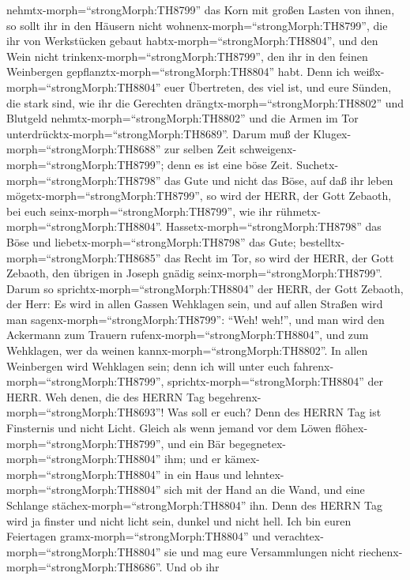 nehmtx-morph=``strongMorph:TH8799'' das Korn mit großen Lasten von
ihnen, so sollt ihr in den Häusern nicht
wohnenx-morph=``strongMorph:TH8799'', die ihr von Werkstücken gebaut
habtx-morph=``strongMorph:TH8804'', und den Wein nicht
trinkenx-morph=``strongMorph:TH8799'', den ihr in den feinen Weinbergen
gepflanztx-morph=``strongMorph:TH8804'' habt.  Denn ich
weißx-morph=``strongMorph:TH8804'' euer Übertreten, des viel ist, und
eure Sünden, die stark sind, wie ihr die Gerechten
drängtx-morph=``strongMorph:TH8802'' und Blutgeld
nehmtx-morph=``strongMorph:TH8802'' und die Armen im Tor
unterdrücktx-morph=``strongMorph:TH8689''.  Darum muß der
Klugex-morph=``strongMorph:TH8688'' zur selben Zeit
schweigenx-morph=``strongMorph:TH8799''; denn es ist eine böse Zeit.
 Suchetx-morph=``strongMorph:TH8798'' das Gute und nicht
das Böse, auf daß ihr leben mögetx-morph=``strongMorph:TH8799'', so wird
der HERR, der Gott Zebaoth, bei euch seinx-morph=``strongMorph:TH8799'',
wie ihr rühmetx-morph=``strongMorph:TH8804''. 
Hassetx-morph=``strongMorph:TH8798'' das Böse und
liebetx-morph=``strongMorph:TH8798'' das Gute;
bestelltx-morph=``strongMorph:TH8685'' das Recht im Tor, so wird der
HERR, der Gott Zebaoth, den übrigen in Joseph gnädig
seinx-morph=``strongMorph:TH8799''.  Darum so
sprichtx-morph=``strongMorph:TH8804'' der HERR, der Gott Zebaoth, der
Herr: Es wird in allen Gassen Wehklagen sein, und auf allen Straßen wird
man sagenx-morph=``strongMorph:TH8799'': ``Weh! weh!'', und man wird den
Ackermann zum Trauern rufenx-morph=``strongMorph:TH8804'', und zum
Wehklagen, wer da weinen kannx-morph=``strongMorph:TH8802''.
 In allen Weinbergen wird Wehklagen sein; denn ich will
unter euch fahrenx-morph=``strongMorph:TH8799'',
sprichtx-morph=``strongMorph:TH8804'' der HERR.  Weh denen,
die des HERRN Tag begehrenx-morph=``strongMorph:TH8693''! Was soll er
euch? Denn des HERRN Tag ist Finsternis und nicht Licht. 
Gleich als wenn jemand vor dem Löwen
flöhex-morph=``strongMorph:TH8799'', und ein Bär
begegnetex-morph=``strongMorph:TH8804'' ihm; und er
kämex-morph=``strongMorph:TH8804'' in ein Haus und
lehntex-morph=``strongMorph:TH8804'' sich mit der Hand an die Wand, und
eine Schlange stächex-morph=``strongMorph:TH8804'' ihn. 
Denn des HERRN Tag wird ja finster und nicht licht sein, dunkel und
nicht hell.  Ich bin euren Feiertagen
gramx-morph=``strongMorph:TH8804'' und
verachtex-morph=``strongMorph:TH8804'' sie und mag eure Versammlungen
nicht riechenx-morph=``strongMorph:TH8686''.  Und ob ihr
